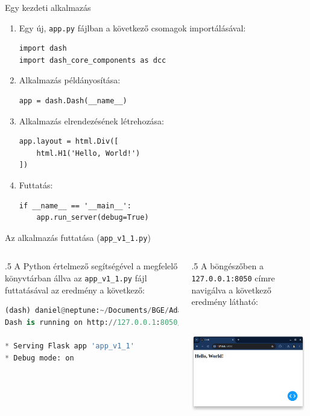 \documentclass[english, aspectratio=169]{beamer}
\begin{document}
\begin{frame}[fragile]{Egy kezdeti alkalmazás}
	\begin{enumerate}
		\item Egy új, \texttt{app.py} fájlban a következő csomagok importálásával:
			\begin{lstlisting}
import dash
import dash_core_components as dcc
			\end{lstlisting}
		\item Alkalmazás példányosítása:
			\begin{lstlisting}
app = dash.Dash(__name__)
			\end{lstlisting}
		\item Alkalmazás elrendezésének létrehozása:
			\begin{lstlisting}
app.layout = html.Div([
	html.H1('Hello, World!')
])
			\end{lstlisting}
		\item Futtatás:
			\begin{lstlisting}
if __name__ == '__main__':
	app.run_server(debug=True)
			\end{lstlisting}
	\end{enumerate}
\end{frame}

\begin{frame}[fragile]{Az alkalmazás futtatása (\texttt{app\_v1\_1.py})}
	\begin{columns}
		\begin{column}{.5\textwidth}
			A Python értelmező segítségével a megfelelő könyvtárban állva az \texttt{app\_v1\_1.py} fájl futtatásával az eredmény a következő:
			\begin{lstlisting}[language=python]
(dash) daniel@neptune:~/Documents/BGE/Adatbanyaszat/2_dash/code$ python app_v1_1.py
Dash is running on http://127.0.0.1:8050/
	
* Serving Flask app 'app_v1_1'
* Debug mode: on
			\end{lstlisting}
		\end{column}
		\begin{column}{.5\textwidth}
			A böngészőben a \texttt{127.0.0.1:8050} címre navigálva a következő eredmény látható:
			\begin{center}
				\includegraphics[width=5cm, height=5cm, keepaspectratio]{images/dash_5.png}
			\end{center}
		\end{column}
	\end{columns}
\end{frame}
\end{document}
